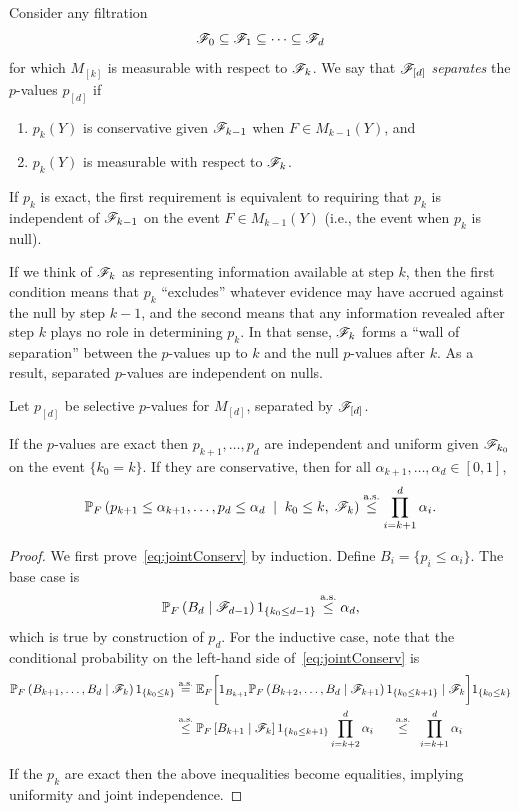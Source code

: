 \documentclass{article}
\begin{document}
Consider any filtration
\[
\mathscr{F}_0 \subseteq \mathscr{F}_1 \subseteq \cdots \subseteq \mathscr{F}_d
\]
for which $M_{[k]}$ is measurable with respect to $\mathscr{F}_k$. We say that $\mathscr{F}_{[d]}$ {\em separates} the $p$-values $p_{[d]}$ if 
\begin{enumerate}
\item $p_k(Y)$ is conservative given $\mathscr{F}_{k-1}$ 
  when $F\in M_{k-1}(Y)$, and
\item $p_k(Y)$ is measurable with respect to $\mathscr{F}_k$.
\end{enumerate}
If $p_k$ is exact, the first requirement is equivalent to requiring that $p_k$ is independent of $\mathscr{F}_{k-1}$ on the event $F\in M_{k-1}(Y)$ (i.e., the event when $p_k$ is null).

If we think of $\mathscr{F}_k$ as representing information available at step $k$, then the first condition means that $p_k$ ``excludes'' whatever evidence may have accrued against the null by step $k-1$, and the second means that any information revealed after step $k$ plays no role in determining $p_k$. In that sense, $\mathscr{F}_k$ forms a ``wall of separation'' between the $p$-values up to $k$ and the null $p$-values after $k$. As a result, separated $p$-values are independent on nulls.

\begin{proposition}\label{prop:jointConserv}

  Let $p_{[d]}$ be selective $p$-values for $M_{[d]}$, 
  separated by $\mathscr{F}_{[d]}$.

  If the $p$-values are exact then $p_{k+1}, \ldots, p_d$ are
  independent and uniform given $\mathscr{F}_{k_0}$ on the event $\{k_0=k\}$.
  If they are conservative, then for all
  $\alpha_{k+1},\ldots,\alpha_d \in [0,1]$,
  \begin{equation}\label{eq:jointConserv}
  \mathbb{P}_F\left(p_{k+1}\leq \alpha_{k+1}, \ldots, p_d \leq \alpha_d\;
    \mid\; k_0 \leq k, \; \mathscr{F}_k\right) \overset{\textrm{a.s.}}{\leq} \prod_{i=k+1}^d
  \alpha_i.
  \end{equation}
\end{proposition}

\begin{proof}
  We first prove~\eqref{eq:jointConserv}
  by induction. Define $B_i = \{p_i \leq \alpha_i\}$. 
  The base case is
  \[
  \mathbb{P}_F\left(B_d \mid \mathscr{F}_{d-1}\right)1_{\{k_0 \leq d-1\}} \overset{\textrm{a.s.}}{\leq} \alpha_d,
  \]
  which is true by construction of $p_d$. 
  For the inductive case, note that the
  conditional probability on the left-hand side
  of~\eqref{eq:jointConserv} is
  \begin{align*}
    \mathbb{P}_F\left(B_{k+1}, \ldots, B_d
      \mid \mathscr{F}_k\right)1_{\{k_0 \leq k\}} 
    &\overset{\textrm{a.s.}}{=} \mathbb{E}_F\bigg[ 1_{B_{k+1}} 
    \mathbb{P}_F\left(B_{k+2}, \ldots, B_d
      \mid \mathscr{F}_{k+1}\right)1_{\{k_0 \leq k+1\}}
    \mid \mathscr{F}_k\bigg]1_{\{k_0 \leq k\}}\\
    &\overset{\textrm{a.s.}}{\leq} \mathbb{P}_F\left[ B_{k+1}
      \mid \mathscr{F}_k\right]1_{\{k_0 \leq k+1\}}\prod_{i=k+2}^d \alpha_i
    \quad\;\;\overset{\textrm{a.s.}}{\leq}\;\; \prod_{i=k+1}^d \alpha_i
  \end{align*}

  If the $p_k$ are exact then the above 
  inequalities become equalities, implying uniformity and joint independence.
\end{proof}
\end{document}
